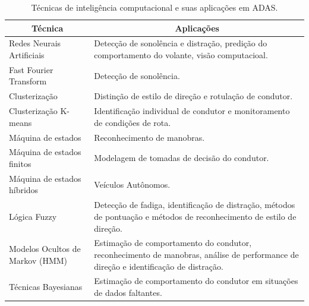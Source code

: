 \begin{table}[!htb]
	\centering
	\caption{Técnicas de inteligência computacional e suas aplicações em ADAS. }
	\label{tecs1}
	\begin{tabular}{p{55mm}|p{95mm}}
		\hline
		\multicolumn{1}{c|}{\textbf{Técnica}} & \multicolumn{1}{|c}{\textbf{Aplicações}}                                                                                            \\ \hline
		Redes Neurais Artificiais              & Detecção de sonolência e distração, predição do comportamento do volante, visão computacioal.                                       \\ \hline
		Fast Fourier Transform                 & Detecção de sonolência.                                                                                                             \\ \hline
		Clusterização                          & Distinção de estilo de direção e rotulação de condutor.                                                                             \\ \hline
		Clusterização K-means                  & Identificação individual de condutor e monitoramento de condições de rota.                                                          \\ \hline
		Máquina de estados                     & Reconhecimento de manobras.                                                                                                         \\ \hline
		Máquina de estados finitos             & Modelagem de tomadas de decisão do condutor.                                                                                        \\ \hline
		Máquina de estados híbridos            & Veículos Autônomos.                                                                                                                 \\ \hline
		Lógica Fuzzy                           & Detecção de fadiga, identificação de distração, métodos de pontuação e métodos de reconhecimento de estilo de direção.              \\ \hline
		Modelos Ocultos de Markov (HMM)        & Estimação de comportamento do condutor, reconhecimento de manobras, análise de performance de direção e identificação de distração. \\ \hline
		Técnicas Bayesianas                    & Estimação de comportamento do condutor em situações de dados faltantes.                                                             \\ \hline

\end{tabular}
\end{table}
